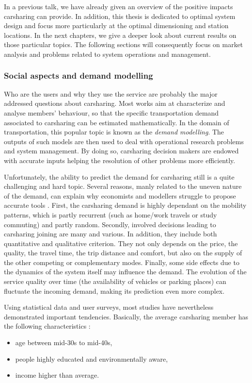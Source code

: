 \begin{bibunit}[ieeetr]
\medskip
In a previous talk, we have already given an overview of the positive impacts carsharing can provide.
In addition, this thesis is dedicated to optimal system design and focus more particularly at the optimal dimensioning and station locations.
In the next chapters, we give a deeper look about current results on those particular topics.
The following sections will consequently focus on market analysis and problems related to system operations and management.


\subsubsection{Social aspects and demand modelling}
Who are the users and why they use the service are probably the major addressed questions about carsharing.
Most works aim at characterize and analyse members' behaviour, so that the specific transportation demand associated to carsharing can be estimated mathematically.
In the domain of transportation, this popular topic is known as the \emph{demand modelling}.
The outputs of such models are then used to deal with operational research problems and system management.
By doing so, carsharing decision makers are endowed with accurate inputs helping the resolution of other problems more efficiently.

\medskip
Unfortunately, the ability to predict the demand for carsharing still is a quite challenging and hard topic.
Several reasons, manly related to the uneven nature of the demand, can explain why economists and modellers struggle to propose accurate tools \cite{danielis_potential_2015}.
First, the carsharing demand is highly dependant on the mobility patterns, which is partly recurrent (such as home/work travels or study commuting) and partly random.
Secondly, involved decisions leading to carsharing joining are many and various.
In addition, they include both quantitative and qualitative criterion.
They not only depends on the price, the quality, the travel time, the trip distance and comfort, but also on the supply of the other competing or complementary modes.
Finally, some side effects due to the dynamics of the system itself may influence the demand.
The evolution of the service quality over time (\eg the availability of vehicles or parking places) can fluctuate the incoming demand, making its prediction even more complex.

\medskip
Using statistical data and user surveys, most studies have nevertheless demonstrated important tendencies.
Basically, the average carsharing member has the following characteristics
\cite{brook_carsharingstart_2004}
\cite{millard_ball_car_sharing_2005}
\cite{lane_phillycarshare_2005}
\cite{zheng_carsharing_2009}
\cite{costain_synopsis_2012}
\cite{efthymiou_which_2012}:
\begin{itemize}
\item age between mid-30s to mid-40s,
\item people highly educated and environmentally aware,
\item income higher than average.
\end{itemize}


\end{bibunit}
